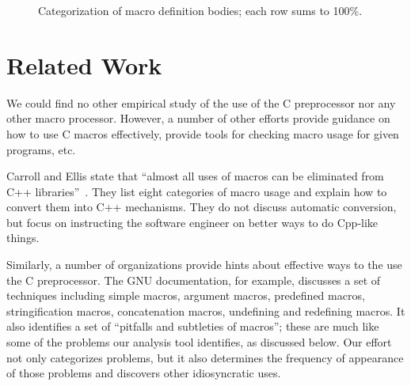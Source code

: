 \documentclass[11pt]{article}
\begin{document}
\begin{figure}
{\small
  \setlength{\tabcolsep}{.25em}
  \centerline{}%
}
\caption{Categorization of macro definition bodies; each row sums to 100\%.}
\label{fig:categorization}
\end{figure}









\section{Related Work}
\label{sec:related}

We could find no other empirical study of the use of the C preprocessor nor
any other macro processor.  However, a number of other efforts provide
guidance on how to use C macros effectively, provide tools for
checking macro usage for given programs, etc.

Carroll and Ellis state that ``almost all uses of macros can be
eliminated from C++ libraries''~\cite[p.~146]{Carroll95}. 
They list eight categories of macro usage and explain how to convert
them into C++ mechanisms.  They do not
discuss automatic conversion, but  focus on instructing the
software engineer on better ways to do Cpp-like things.

Similarly, a number of organizations provide hints about effective
ways to the use the C preprocessor.  The GNU documentation, for example,
discusses a set of techniques including simple macros, argument
macros, predefined macros, stringification macros, concatenation
macros, undefining and redefining
macros.
It also identifies a set of ``pitfalls and subtleties of
macros''; these are much like some of the problems our analysis tool
identifies, as discussed below.  Our effort not only categorizes
problems, but it also determines the frequency of appearance of those
problems and discovers other idiosyncratic uses.
\end{document}
